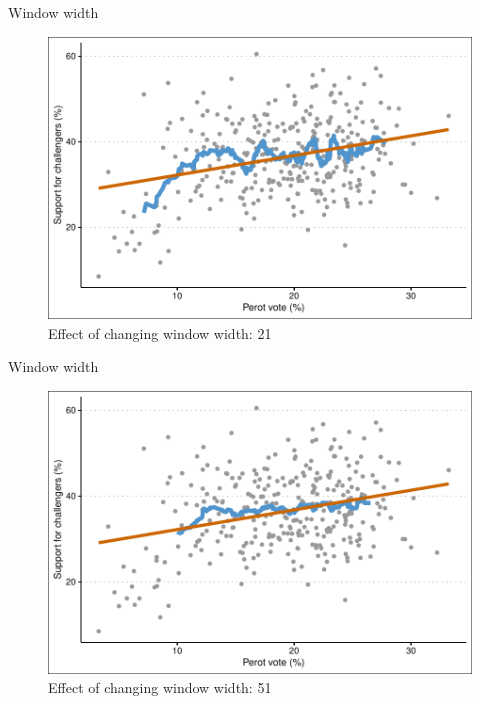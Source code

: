 \documentclass[12pt,english,pdf,xcolor=dvipsnames,aspectratio=169,handout]{beamer}\usepackage[]{graphicx}\usepackage[]{xcolor}
\begin{document}
\begin{frame}{Window width}



\begin{figure}
  \centering
  \includegraphics[scale=0.7]{../04-graphs/04-05c}
  \caption{Effect of changing window width: 21}
\end{figure}

\end{frame}



\begin{frame}{Window width}

\begin{figure}
  \centering
  \includegraphics[scale=0.7]{../04-graphs/04-05a}
  \caption{Effect of changing window width: 51}
\end{figure}
  
\end{frame}
\end{document}
